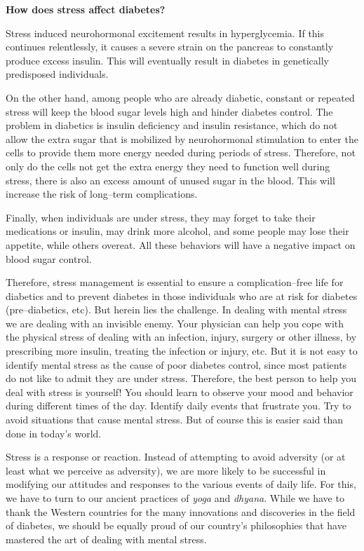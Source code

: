 \textbf{How does stress affect diabetes?}

Stress induced neurohormonal excitement results in hyperglycemia. If this continues relentlessly, it causes a severe strain on the pancreas to constantly produce excess insulin. This will eventually result in diabetes in genetically predisposed individuals.

On the other hand, among people who are already diabetic, constant or repeated stress will keep the blood sugar levels high and hinder diabetes control. The problem in diabetics is insulin deficiency and insulin resistance, which do not allow the extra sugar that is mobilized by neurohormonal stimulation to enter the cells to provide them more energy needed during periods of stress. Therefore, not only do the cells not get the extra energy they need to function well during stress, there is also an excess amount of unused sugar in the blood. This will increase the risk of long–term complications.

Finally, when individuals are under stress, they may forget to take their medications or insulin, may drink more alcohol, and some people may lose their appetite, while others overeat. All these behaviors will have a negative impact on blood sugar control.

Therefore, stress management is essential to ensure a complication–free life for diabetics and to prevent diabetes in those individuals who are at risk for diabetes (pre–diabetics, etc). But herein lies the challenge. In dealing with mental stress we are dealing with an invisible enemy. Your physician can help you cope with the physical stress of dealing with an infection, injury, surgery or other illness, by prescribing more insulin, treating the infection or injury, etc. But it is not easy to identify mental stress as the cause of poor diabetes control, since most patients do not like to admit they are under stress. Therefore, the best person to help you deal with stress is yourself! You should learn to observe your mood and behavior during different times of the day. Identify daily events that frustrate you. Try to avoid situations that cause mental stress. But of course this is easier said than done in today’s world.

Stress is a response or reaction. Instead of attempting to avoid adversity (or at least what we perceive as adversity), we are more likely to be successful in modifying our attitudes and responses to the various events of daily life. For this, we have to turn to our ancient practices of \textit{yoga} and \textit{dhyana}. While we have to thank the Western countries for the many innovations and discoveries in the field of diabetes, we should be equally proud of our country’s philosophies that have mastered the art of dealing with mental stress.

